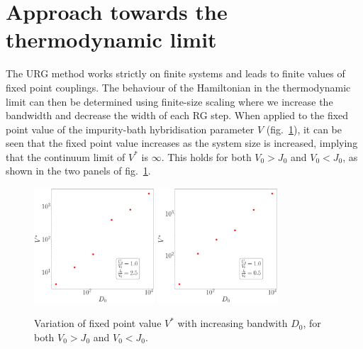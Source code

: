 \documentclass{report}
\numberwithin{equation}{section}
\begin{document}
\section{Approach towards the thermodynamic limit}
The URG method works strictly on finite systems and leads to finite values of fixed point couplings. The behaviour of the Hamiltonian in the thermodynamic limit can then be determined using finite-size scaling where we increase the bandwidth and decrease the width of each RG step. When applied to the fixed point value of the impurity-bath hybridisation parameter \(V\) (fig.~\ref{V_vs_D}), it can be seen that the fixed point value increases as the system size is increased, implying that the continuum limit of \(V^*\) is \(\infty\). This holds for both \(V_0 > J_0\) and \(V_0 < J_0\), as shown in the two panels of fig.~\ref{V_vs_D}.
\begin{figure}[htpb]
	\centering
	\hspace*{\fill}
	\includegraphics[width=0.4\textwidth]{../figures/Vstar_vs_D_smallV.pdf}
	\hspace*{\fill}
	\includegraphics[width=0.4\textwidth]{../figures/Vstar_vs_D_largeV.pdf}
	\hspace*{\fill}
	\caption{Variation of fixed point value \(V^*\) with increasing bandwith \(D_0\), for both \(V_0 > J_0\) and \(V_0 < J_0\).}
	\label{V_vs_D}
\end{figure}
\end{document}
